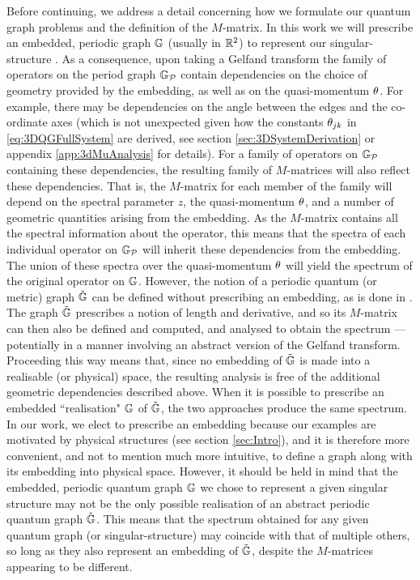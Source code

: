 Before continuing, we address a detail concerning how we formulate our quantum graph problems and the definition of the $M$-matrix.
In this work we will prescribe an embedded, periodic graph $\mathbb{G}$ (usually in $\mathbb{R}^2$) to represent our singular-structure .
As a consequence, upon taking a Gelfand transform the family of operators on the period graph $\mathbb{G}_{\mathcal{P}}$ contain dependencies on the choice of geometry provided by the embedding, as well as on the quasi-momentum $\theta$.
For example, there may be dependencies on the angle between the edges and the co-ordinate axes (which is not unexpected given how the constants $\theta_{jk}$ in \eqref{eq:3DQGFullSystem} are derived, see section \ref{sec:3DSystemDerivation} or appendix \ref{app:3dMuAnalysis} for details).
For a family of operators on $\mathbb{G}_{\mathcal{P}}$ containing these dependencies, the resulting family of  $M$-matrices will also reflect these dependencies.
That is, the $M$-matrix for each member of the family will depend on the spectral parameter $z$, the quasi-momentum $\theta$, and a number of geometric quantities arising from the embedding.
As the $M$-matrix contains all the spectral information about the operator, this means that the spectra of each individual operator on $\mathbb{G}_{\mathcal{P}}$ will inherit these dependencies from the embedding. 
The union of these spectra over the quasi-momentum $\theta$ will yield the spectrum of the original operator on $\mathbb{G}$.
However, the notion of a periodic quantum (or metric) graph $\tilde{\mathbb{G}}$ can be defined without prescribing an embedding, as is done in \cite[Chapter~4]{berkolaiko2013introduction}.
The graph $\tilde{\mathbb{G}}$ prescribes a notion of length and derivative, and so its $M$-matrix can then also be defined and computed, and analysed to obtain the spectrum --- potentially in a manner involving an abstract version of the Gelfand transform.
Proceeding this way means that, since no embedding of $\tilde{\mathbb{G}}$ is made into a realisable (or physical) space, the resulting analysis is free of the additional geometric dependencies described above.
When it is possible to prescribe an embedded ``realisation" $\mathbb{G}$ of $\tilde{\mathbb{G}}$, the two approaches produce the same spectrum.
In our work, we elect to prescribe an embedding because our examples are motivated by physical structures (see section \ref{sec:Intro}), and it is therefore more convenient, and not to mention much more intuitive, to define a graph along with its embedding into physical space.
However, it should be held in mind that the embedded, periodic quantum graph $\mathbb{G}$ we chose to represent a given singular structure may not be the only possible realisation of an abstract periodic quantum graph $\tilde{\mathbb{G}}$.
This means that the spectrum obtained for any given quantum graph (or singular-structure) may coincide with that of multiple others, so long as they also represent an embedding of $\tilde{\mathbb{G}}$, despite the $M$-matrices appearing to be different.
